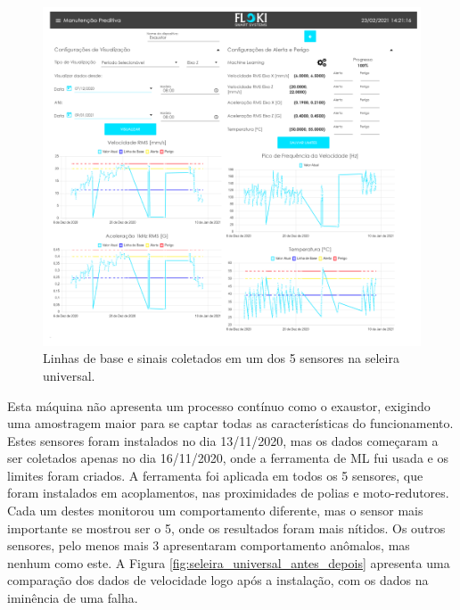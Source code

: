 \begin{figure}[H]
    \caption{Linhas de base e sinais coletados em um dos 5 sensores na seleira universal.}
    \begin{center}
        \includegraphics[scale=0.9, page=4]{resultados/img/resultados.pdf}
    \end{center}
    \label{fig:seleira_universal}
\end{figure}

Esta máquina não apresenta um processo contínuo como o exaustor, exigindo uma amostragem maior para se captar todas as características do 
funcionamento. Estes sensores foram instalados no dia 13/11/2020, mas os dados começaram a ser coletados apenas no dia 16/11/2020, onde a 
ferramenta de ML fui usada e os limites foram criados. 
A ferramenta foi aplicada em todos os 5 sensores, que foram instalados em acoplamentos, nas proximidades de polias e moto-redutores.
Cada um destes monitorou um comportamento diferente, mas o sensor mais importante se mostrou ser o 5, onde os resultados foram mais nítidos. 
Os outros sensores, pelo menos mais 3 apresentaram comportamento anômalos, mas nenhum como este. A Figura \ref{fig:seleira_universal_antes_depois}
apresenta uma comparação dos dados de velocidade logo após a instalação, com os dados na iminência de uma falha.

